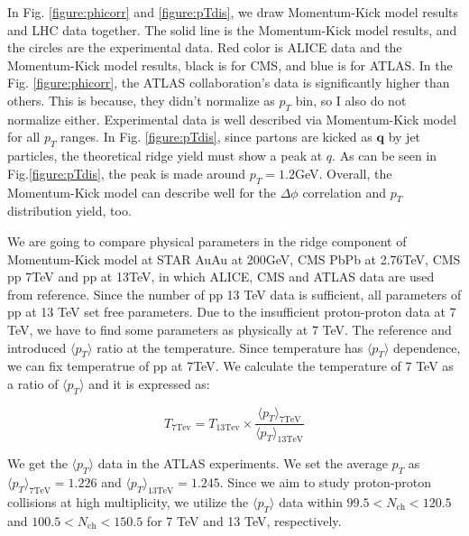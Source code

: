 \documentclass[jkps,fleqn,showpacs,showkeys]{revtex4}
\begin{document}
In Fig. \ref{figure:phicorr} and \ref{figure:pTdis}, we draw Momentum-Kick model results and LHC data together.
The solid line is the Momentum-Kick model results, and the circles are the experimental data.
Red color is ALICE data and the Momentum-Kick model results, black is for CMS, and blue is for ATLAS.
In the Fig. \ref{figure:phicorr}, the ATLAS collaboration's data is significantly higher than others.
This is because, they didn't normalize as $p_T$ bin, so I also do not normalize either.
Experimental data is well described via Momentum-Kick model for all $p_T$ ranges.
In Fig. \ref{figure:pTdis}, since partons are kicked as $\textbf{q}$ by jet particles, the theoretical ridge yield must show a peak at $q$.
As can be seen in Fig.\ref{figure:pTdis}, the peak is made around $p_T=1.2$GeV.
Overall, the Momentum-Kick model can describe well for the $\Delta\phi$ correlation and $p_T$ distribution yield, too.


We are going to compare physical parameters in the ridge component of Momentum-Kick model at STAR AuAu at 200GeV\cite{Wong_1}, CMS PbPb at 2.76TeV\cite{PbPb}, CMS pp 7TeV\cite{cms} and pp at 13TeV, in which ALICE, CMS and ATLAS data are used from reference\cite{alice, cms, atlas}.
Since the number of pp 13 TeV data is sufficient, all parameters of pp at 13 TeV set free parameters.
Due to the insufficient proton-proton data at 7 TeV, we have to find some parameters as physically at 7 TeV.
The reference \cite{Wong_5} and \cite{PbPb} introduced $\langle p_T \rangle$ ratio at the temperature.
Since temperature has $\langle p_T \rangle$ dependence, we can fix temperatrue of pp at 7TeV.
We calculate the temperature of 7 TeV as a ratio of $\langle p_T \rangle$ and it is expressed as:

\begin{equation} \label{equation:Tempratio}
T_{7 \text{Tev}} = T_{13 \text{Tev}} \times \frac{\langle p_T \rangle_{7 \text{TeV}}}{\langle p_T \rangle_{13 \text{TeV}}}
\end{equation}

We get the $\langle p_T \rangle$ data in the ATLAS experiments\cite{ATLAS:2010jvh, ATLAS:2016zkp}.
We set the average $p_T$ as $\langle p_T \rangle _{7 \text{TeV}} = 1.226$ and $\langle p_T \rangle _{13 \text{TeV}} = 1.245$.
Since we aim to study proton-proton collisions at high multiplicity, we utilize the $\langle p_T \rangle$ data within $99.5 < N_{\text{ch}} < 120.5$ and $100.5 < N_{\text{ch}} < 150.5$ for 7 TeV and 13 TeV, respectively.
\end{document}
